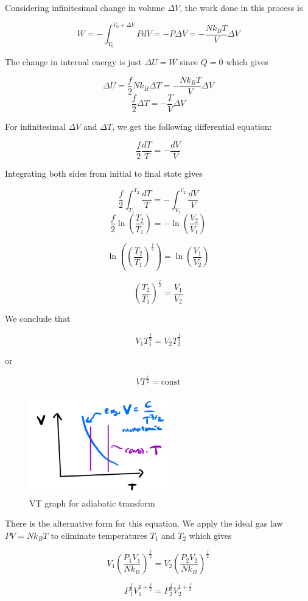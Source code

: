 \documentclass[12pt, a4paper]{article}
\begin{document}
Considering infinitesimal change in volume $\Delta V$, the work done in this process is

\[W=-\int_{V_0}^{V_0+\Delta V} PdV=-P\Delta V=-\frac{Nk_BT}{V} \Delta V\]

The change in internal energy is just $\Delta U=W$ since $Q=0$ which gives

\[\Delta U=\frac{f}{2}Nk_B\Delta T=-\frac{Nk_BT}{V} \Delta V\]
\[\frac{f}{2}\Delta T=-\frac{T}{V}\Delta V\]

For infinitesimal $\Delta V$ and $\Delta T$, we get the following differential equation:

\[\frac{f}{2}\frac{dT}{T}=-\frac{dV}{V}\]

Integrating both sides from initial to final state gives

\[\frac{f}{2}\int_{T_1}^{T_2}\frac{dT}{T}=-\int_{V_1}^{V_2}\frac{dV}{V}\]
\[\frac{f}{2}\ln\left(\frac{T_2}{T_1}\right)=-\ln\left(\frac{V_2}{V_1}\right)\]

\[\ln\left( \left(\frac{T_2}{T_1}\right)^{\frac{f}{2}} \right)=\ln\left(\frac{V_1}{V_2}\right)\]

\[ \left(\frac{T_2}{T_1}\right)^{\frac{f}{2}}=\frac{V_1}{V_2} \]

We conclude that

\[V_1T_1^\frac{f}{2}=V_2T_2^\frac{f}{2}\]

or

\[VT^\frac{f}{2}=\text{const}\]

\begin{figure}[H]
\centering
\includegraphics[width=60mm]{30.png}
\caption{VT graph for adiabatic transform}
\end{figure}

There is the alternative form for this equation. We apply the ideal gas law $PV=Nk_BT$ to eliminate temperatures $T_1$ and $T_2$ which gives

\[V_1\left(\frac{P_1V_1}{Nk_B}\right)^\frac{f}{2}=V_2\left(\frac{P_2V_2}{Nk_B}\right)^\frac{f}{2}\]

\[P_1^\frac{f}{2} V_1^{1+\frac{f}{2}}=P_2^\frac{f}{2} V_2^{1+\frac{f}{2}}\]
\end{document}
